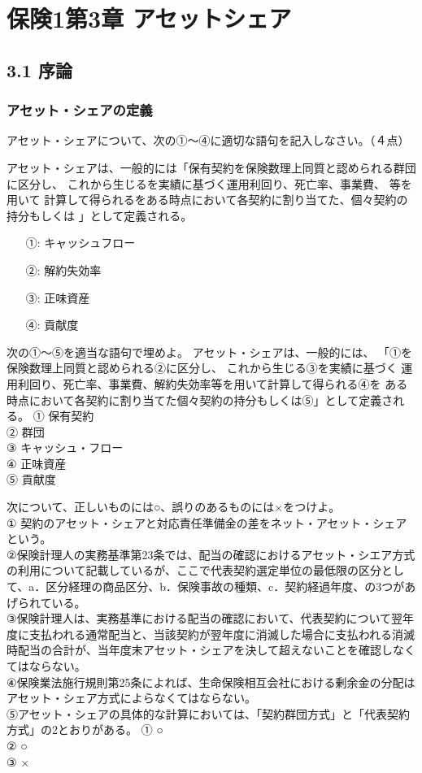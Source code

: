 \documentclass[report,gutter=10mm,fore-edge=10mm,uplatex,dvipdfmx]{jlreq}
\begin{document}
\chapter{保険1第3章 アセットシェア}
\section{3.1 序論}
\subsection{アセット・シェアの定義}
アセット・シェアについて、次の①～④に適切な語句を記入しなさい。（４点）

アセット・シェアは、一般的には「保有契約を保険数理上同質と認められる群団に区分し、
これから生じるを実績に基づく運用利回り、死亡率、事業費、
等を用いて
計算して得られるをある時点において各契約に割り当てた、個々契約の持分もしくは
」として定義される。

\answer{}
\begin{itemize}
\item[ ①: ] キャッシュフロー 
\item[ ②: ] 解約失効率 
\item[ ③: ] 正味資産 
\item[ ④: ] 貢献度
\end{itemize}

次の①～⑤を適当な語句で埋めよ。
アセット・シェアは、一般的には、
「①を保険数理上同質と認められる②に区分し、
これから生じる③を実績に基づく
運用利回り、死亡率、事業費、解約失効率等を用いて計算して得られる④を
ある時点において各契約に割り当てた個々契約の持分もしくは⑤」として定義される。
\answer{}
\noindent
① 保有契約\\
② 群団\\
③ キャッシュ・フロー\\
④ 正味資産\\
⑤ 貢献度

次について、正しいものには○、誤りのあるものには×をつけよ。\\
① 契約のアセット・シェアと対応責任準備金の差をネット・アセット・シェアという。\\
②保険計理人の実務基準第23条では、配当の確認におけるアセット・シエア方式の利用について記載しているが、ここで代表契約選定単位の最低限の区分として、a．区分経理の商品区分、b．保険事故の種類、c．契約経過年度、の3つがあげられている。\\
③保険計理人は、実務基準における配当の確認において、代表契約について翌年度に支払われる通常配当と、当該契約が翌年度に消滅した場合に支払われる消滅時配当の合計が、当年度末アセット・シェアを決して超えないことを確認しなくてはならない。\\
④保険業法施行規則第25条によれば、生命保険相互会社における剰余金の分配はアセット・シェア方式によらなくてはならない。\\
⑤アセット・シェアの具体的な計算においては、「契約群団方式」と「代表契約方式」の2とおりがある。
\answer{}
\noindent
① ○\\
② ○\\
③ ×
\end{document}
